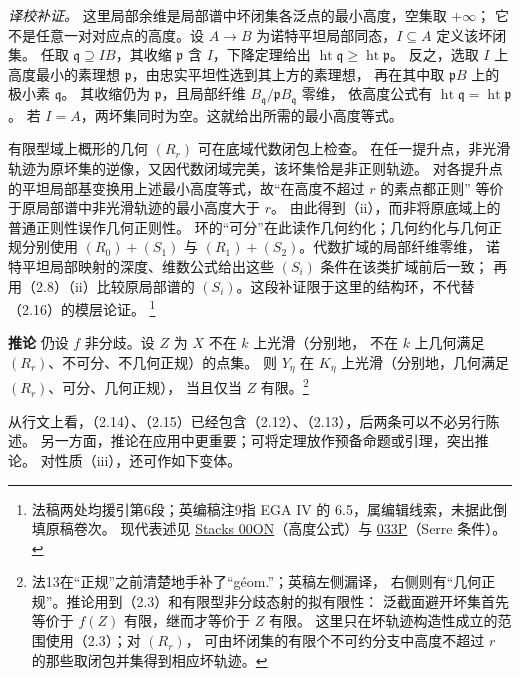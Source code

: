 \documentclass[openany,fontset=fandol]{ctexbook}
\newcommand{\tagitem}[2]{\par\medskip\noindent\textbf{#1\quad #2}\enspace}
\begin{document}
\noindent\emph{译校补证。}
这里局部余维是局部谱中坏闭集各泛点的最小高度，空集取 $+\infty$；
它不是任意一对对应点的高度。设 $A\to B$ 为诺特平坦局部同态，$I\subseteq A$ 定义该坏闭集。
任取 $\mathfrak q\supseteq IB$，其收缩 $\mathfrak p$ 含 $I$，下降定理给出
$\operatorname{ht}\mathfrak q\ge\operatorname{ht}\mathfrak p$。
反之，选取 $I$ 上高度最小的素理想 $\mathfrak p$，由忠实平坦性选到其上方的素理想，
再在其中取 $\mathfrak pB$ 上的极小素 $\mathfrak q$。
其收缩仍为 $\mathfrak p$，且局部纤维 $B_{\mathfrak q}/\mathfrak p B_{\mathfrak q}$ 零维，
依高度公式有 $\operatorname{ht}\mathfrak q=\operatorname{ht}\mathfrak p$。
若 $I=A$，两坏集同时为空。这就给出所需的最小高度等式。

有限型域上概形的几何 $(R_r)$ 可在底域代数闭包上检查。
在任一提升点，非光滑轨迹为原坏集的逆像，又因代数闭域完美，该坏集恰是非正则轨迹。
对各提升点的平坦局部基变换用上述最小高度等式，故“在高度不超过 $r$ 的素点都正则”
等价于原局部谱中非光滑轨迹的最小高度大于 $r$。
由此得到（ii），而非将原底域上的普通正则性误作几何正则性。
环的“可分”在此读作几何约化；几何约化与几何正规分别使用
$(R_0)+(S_1)$ 与 $(R_1)+(S_2)$。代数扩域的局部纤维零维，
诺特平坦局部映射的深度、维数公式给出这些 $(S_i)$ 条件在该类扩域前后一致；
再用（2.8）（ii）比较原局部谱的 $(S_i)$。这段补证限于这里的结构环，不代替（2.16）的模层论证。
\footnote{法稿两处均援引第6段；英编稿注9指 EGA IV 的 6.5，属编辑线索，未据此倒填原稿卷次。
现代表述见 \href{https://stacks.math.columbia.edu/tag/00ON}{Stacks 00ON}（高度公式）与
\href{https://stacks.math.columbia.edu/tag/033P}{033P}（Serre 条件）。}

\tagitem{推论}{2.15}
仍设 $f$ 非分歧。设 $Z$ 为 $X$ 不在 $k$ 上光滑（分别地，
不在 $k$ 上几何满足 $(R_r)$、不可分、不几何正规）的点集。
则 $Y_\eta$ 在 $K_\eta$ 上光滑（分别地，几何满足 $(R_r)$、可分、几何正规），
当且仅当 $Z$ 有限。\footnote{法13在“正规”之前清楚地手补了“géom.”；英稿左侧漏译，
右侧则有“几何正规”。推论用到（2.3）和有限型非分歧态射的拟有限性：
泛截面避开坏集首先等价于 $f(Z)$ 有限，继而才等价于 $Z$ 有限。
这里只在坏轨迹构造性成立的范围使用（2.3）；对 $(R_r)$，
可由坏闭集的有限个不可约分支中高度不超过 $r$ 的那些取闭包并集得到相应坏轨迹。}

从行文上看，（2.14）、（2.15）已经包含（2.12）、（2.13），后两条可以不必另行陈述。
另一方面，推论在应用中更重要；可将定理放作预备命题或引理，突出推论。
对性质（iii），还可作如下变体。
\end{document}
